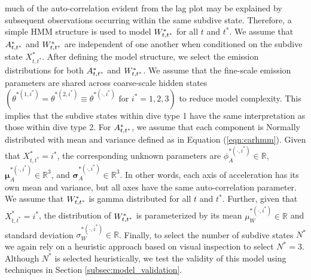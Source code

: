 much of the auto-correlation evident from the lag plot may be explained by subsequent observations occurring within the same subdive state. Therefore, a simple HMM structure is used to model $W^*_{t,t^*}$ for all $t$ and $t^*$. We assume that $A^*_{t,t^*}$ and $W^*_{t,t^*}$ are independent of one another when conditioned on the subdive state $X^*_{t,t^*}$. 
%
%
%
After defining the model structure, we select the emission distributions for both $A^*_{t,t^*}$ and $W^*_{t,t^*}$. We assume that the fine-scale emission parameters are shared across coarse-scale hidden states $\left(\theta^{*(1,i^*)} = \theta^{*(2,i^*)} \equiv \theta^{*(\cdot,i^*)} \text{ for } i^* = 1,2,3\right)$ to reduce model complexity. This implies that the subdive states within dive type 1 have the same interpretation as those within dive type 2. 
%
For $A^*_{t,t^*}$, we assume that each component is Normally distributed with mean and variance defined as in Equation (\ref{eqn:carhmm}). Given that $X^*_{t,t^*} = i^*$, the corresponding unknown parameters are $\phi_A^{*(\cdot,i^*)} \in \mathbb{R}$, $\mathbf{\mu}_A^{*(\cdot,i^*)} \in \mathbb{R}^3$, and $\mathbf{\sigma}_A^{*(\cdot,i^*)} \in \mathbb{R}^3$. In other words, each axis of acceleration has its own mean and variance, but all axes have the same auto-correlation parameter.
%
We assume that $W^*_{t,t^*}$ is gamma distributed for all $t$ and $t^*$. Further, given that $X^*_{t,t^*} = i^*$, the distribution of $W^*_{t,t^*}$ is parameterized by its mean $\mu_W^{*(\cdot,i^*)} \in \mathbb{R}$ and standard deviation $\sigma_W^{*(\cdot,i^*)} \in \mathbb{R}$.
%
Finally, to select the number of subdive states $N^*$ we again rely on a heuristic approach based on visual inspection to select $N^* = 3$. Although $N^*$ is selected heuristically, we test the validity of this model using techniques in Section \ref{subsec:model_validation}.

